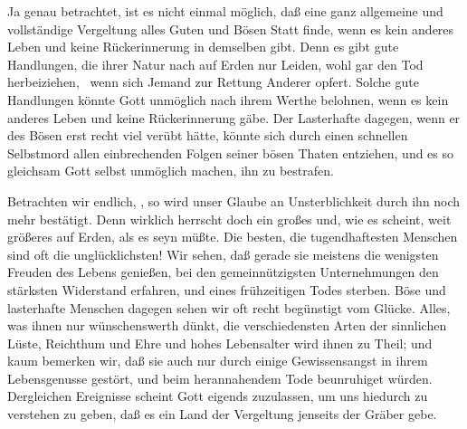 \begin{aufza}
\begin{aufzb}
\item Ja genau betrachtet, ist es nicht einmal möglich, daß eine ganz allgemeine und vollständige Vergeltung alles Guten und Bösen Statt finde, wenn es kein anderes Leben und keine Rückerinnerung in demselben gibt. Denn es gibt gute Handlungen, die ihrer Natur nach auf Erden nur Leiden, wohl gar den Tod herbeiziehen, \zB\ wenn sich Jemand zur Rettung Anderer opfert. Solche gute Handlungen könnte Gott unmöglich nach ihrem Werthe belohnen, wenn es kein anderes Leben und keine Rückerinnerung gäbe. Der Lasterhafte dagegen, wenn er des Bösen erst recht viel verübt hätte, könnte sich durch einen schnellen Selbstmord allen einbrechenden Folgen seiner bösen Thaten entziehen, und es so gleichsam Gott selbst unmöglich machen, ihn zu bestrafen.
\end{aufzb}
\item Betrachten wir endlich, , so wird unser Glaube an Unsterblichkeit durch ihn noch mehr bestätigt. Denn wirklich herrscht doch ein großes und, wie es scheint, weit größeres  auf Erden, als es seyn müßte. Die besten, die tugendhaftesten Menschen sind oft die unglücklichsten! Wir sehen, daß gerade sie meistens die wenigsten Freuden des Lebens genießen, bei den gemeinnützigsten Unternehmungen den stärksten Widerstand erfahren, und eines frühzeitigen Todes sterben. Böse und lasterhafte Menschen dagegen sehen wir oft recht begünstigt vom Glücke. Alles, was ihnen nur wünschenswerth dünkt, die verschiedensten Arten der sinnlichen Lüste, Reichthum und Ehre und hohes Lebensalter wird ihnen zu Theil; und kaum bemerken wir, daß sie auch nur durch einige Gewissensangst in ihrem Lebensgenusse gestört, und beim herannahendem Tode beunruhiget würden. Dergleichen Ereignisse scheint Gott eigends zuzulassen, um uns hiedurch zu verstehen zu geben, daß es ein Land der Vergeltung jenseits der Gräber gebe.
\end{aufza}
